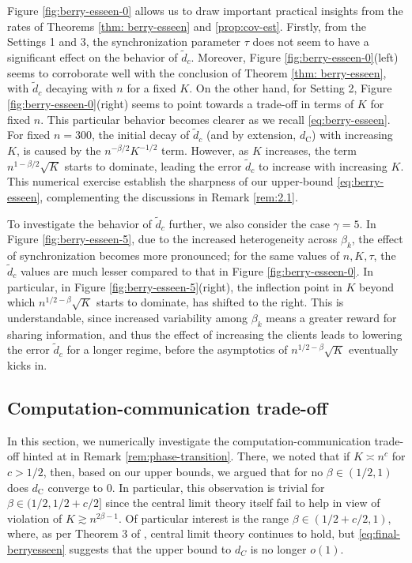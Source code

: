 \documentclass[a4paper,11pt]{article}
\numberwithin{equation}{section}
\theoremstyle{plain}
\theoremstyle{remark}
\begin{document}
Figure \ref{fig:berry-esseen-0} allows us to draw important practical insights from the rates of Theorems \ref{thm: berry-esseen} and \ref{prop:cov-est}. Firstly, from the Settings 1 and 3, the synchronization parameter $\tau$ does not seem to have a significant effect on the behavior of $\tilde{d}_c$. Moreover, Figure \ref{fig:berry-esseen-0}(left) seems to corroborate well with the conclusion of Theorem \ref{thm: berry-esseen}, with $\tilde{d}_c$ decaying with $n$ for a fixed $K$. On the other hand, for Setting 2, Figure \ref{fig:berry-esseen-0}(right) seems to point towards a trade-off in terms of $K$ for fixed $n$. This particular behavior becomes clearer as we recall \eqref{eq:berry-esseen}. For fixed $n=300$, the initial decay of $\tilde{d}_c$ (and by extension, $d_{\mathrm{C}}$) with increasing $K$, is caused by the $n^{-\beta/2}K^{-1/2}$ term. However, as $K$ increases, the term $n^{1-\beta/2}\sqrt{K}$ starts to dominate, leading the error $\tilde{d}_c$ to increase with increasing $K$. This numerical exercise establish the sharpness of our upper-bound \eqref{eq:berry-esseen}, complementing the discussions in Remark \ref{rem:2.1}.  

To investigate the behavior of $\tilde{d}_c$ further, we also consider the case $\gamma=5$. In Figure \ref{fig:berry-esseen-5}, due to the increased heterogeneity across $\beta_k$, the effect of synchronization becomes more pronounced; for the same values of $n,K, \tau$, the $\tilde{d}_c$ values are much lesser compared to that in Figure \ref{fig:berry-esseen-0}. In particular, in Figure \ref{fig:berry-esseen-5}(right), the inflection point in $K$ beyond which $n^{1/2-\beta}\sqrt{K}$ starts to dominate, has shifted to the right. This is understandable, since increased variability among $\beta_k$ means a greater reward for sharing information, and thus the effect of increasing the clients leads to lowering the error $\tilde{d}_c$ for a longer regime, before the asymptotics of $n^{1/2-\beta}\sqrt{K}$ eventually kicks in.

\subsection{Computation-communication trade-off}\label{se:main-simu-2}
In this section, we numerically investigate the computation-communication trade-off hinted at in  Remark \ref{rem:phase-transition}. There, we noted that if $K \asymp n^c$ for $c>1/2$, then, based on our upper bounds, we argued that for no $\beta \in (1/2, 1)$ does $d_{\mathrm{C}}$ converge to $0$. In particular, this observation is trivial for $\beta \in (1/2, 1/2+c/2]$ since the central limit theory itself fail to help in view of violation of $K \gtrsim n^{2\beta-1}$. Of particular interest is the range $\beta \in (1/2+c/2, 1)$, where, as per Theorem 3 of \cite{songxichen2024}, central limit theory continues to hold, but \eqref{eq:final-berryesseen} suggests that the upper bound to $d_{C}$ is no longer $o(1)$. 
\end{document}
